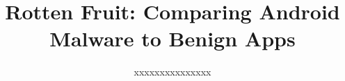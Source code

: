 \documentclass{sig-alternate}
\newcommand{\todo}[1]{\textcolor{cyan}{\textbf{[#1]}}}
\newif\ifisnopii
\begin{document}

\title{Rotten Fruit: Comparing Android Malware to Benign Apps}


\ifisnopii %
\author{
%
\alignauthor
Daniel E. Krutz, Andrew Meneely, and Samuel A. Malachowsky\\ 	
	\affaddr{Software Engineering Department}\\
       \affaddr{Rochester Institute of Technology}\\
       \affaddr{1 Lomb Memorial Drive}\\
       \affaddr{Rochester, NY, USA} \\
       \email{\{dxkvse, axmvse, samvse\}@rit.edu}
       \alignauthor
} %

\else %
\author{
%
\alignauthor
xxxxxxxxxxxxxxx\\ 	
	\\
       \\
       \\
        \\
       \alignauthor
} %
\fi %
\end{document}
